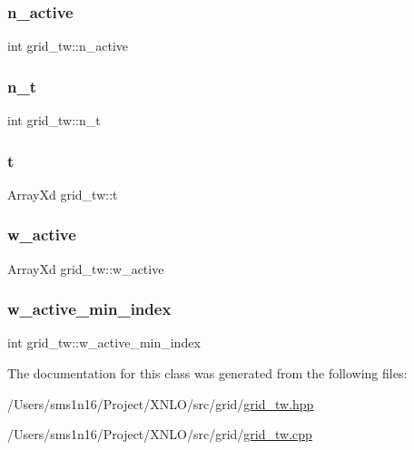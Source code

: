 \subsubsection{\texorpdfstring{n\+\_\+active}{n\_active}}
{\footnotesize\ttfamily int grid\+\_\+tw\+::n\+\_\+active}

\mbox{\label{classgrid__tw_ac121ce740479f628bdaa54627540ad42}} 
\subsubsection{\texorpdfstring{n\+\_\+t}{n\_t}}
{\footnotesize\ttfamily int grid\+\_\+tw\+::n\+\_\+t}

\mbox{\label{classgrid__tw_a918f1e6d18056d0f6da08fe01089b9b0}} 
\subsubsection{\texorpdfstring{t}{t}}
{\footnotesize\ttfamily Array\+Xd grid\+\_\+tw\+::t}

\mbox{\label{classgrid__tw_a66922766c9dfe5c4667e55e678b134b9}} 
\subsubsection{\texorpdfstring{w\+\_\+active}{w\_active}}
{\footnotesize\ttfamily Array\+Xd grid\+\_\+tw\+::w\+\_\+active}

\mbox{\label{classgrid__tw_a27d987fb3c8cbacf9cd152b83477f0d9}} 
\subsubsection{\texorpdfstring{w\+\_\+active\+\_\+min\+\_\+index}{w\_active\_min\_index}}
{\footnotesize\ttfamily int grid\+\_\+tw\+::w\+\_\+active\+\_\+min\+\_\+index}



The documentation for this class was generated from the following files\+:\begin{DoxyCompactItemize}
\item 
/\+Users/sms1n16/\+Project/\+X\+N\+L\+O/src/grid/\hyperlink{grid__tw_8hpp}{grid\+\_\+tw.\+hpp}\item 
/\+Users/sms1n16/\+Project/\+X\+N\+L\+O/src/grid/\hyperlink{grid__tw_8cpp}{grid\+\_\+tw.\+cpp}\end{DoxyCompactItemize}
